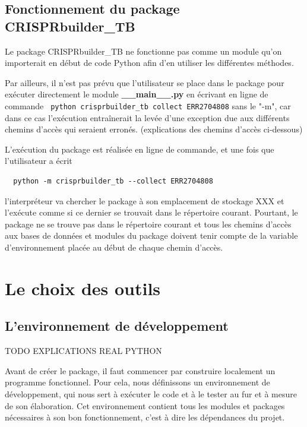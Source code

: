 \documentclass[twoside,a4paper,11pt,frenchb,openany]{report}
\begin{document}
\section{Fonctionnement du package CRISPRbuilder\_TB}



Le package CRISPRbuilder\_TB ne fonctionne pas comme un module qu'on importerait en début de code Python afin d'en utiliser les différentes méthodes.

Par ailleurs, il n'est pas prévu que l'utilisateur se place dans le package pour exécuter directement le module \textbf{\_\_main\_\_.py} en écrivant en ligne de commande
\texttt{ python crisprbuilder\_tb \textemdash \textemdash collect ERR2704808}
sans le "-m", car dans ce cas l'exécution entraînerait la levée d'une exception due aux différents chemins d'accès qui seraient erronés. (explications des chemins d'accès ci-dessous)

L'exécution du package est réalisée en ligne de commande, et une fois que l'utilisateur a écrit 
\begin{verbatim}  python -m crisprbuilder_tb --collect ERR2704808\end{verbatim}

l'interpréteur va chercher le package à son emplacement de stockage XXX et l'exécute comme si ce dernier se trouvait dans le répertoire courant. Pourtant, le package ne se trouve pas dans le répertoire courant et tous les chemins d'accès aux bases de données et modules du package doivent tenir compte de la variable d'environnement placée au début de chaque chemin d'accès.



\chapter{Le choix des outils}




\section{L'environnement de développement}

TODO EXPLICATIONS REAL PYTHON

Avant de créer le package, il faut commencer par construire localement un programme fonctionnel. Pour cela, nous définissons un environnement de développement, qui nous sert à exécuter le code et à le tester au fur et à mesure de son élaboration. Cet environnement contient tous les modules et packages nécessaires à son bon fonctionnement, c'est à dire les dépendances du projet.
 
\end{document}
